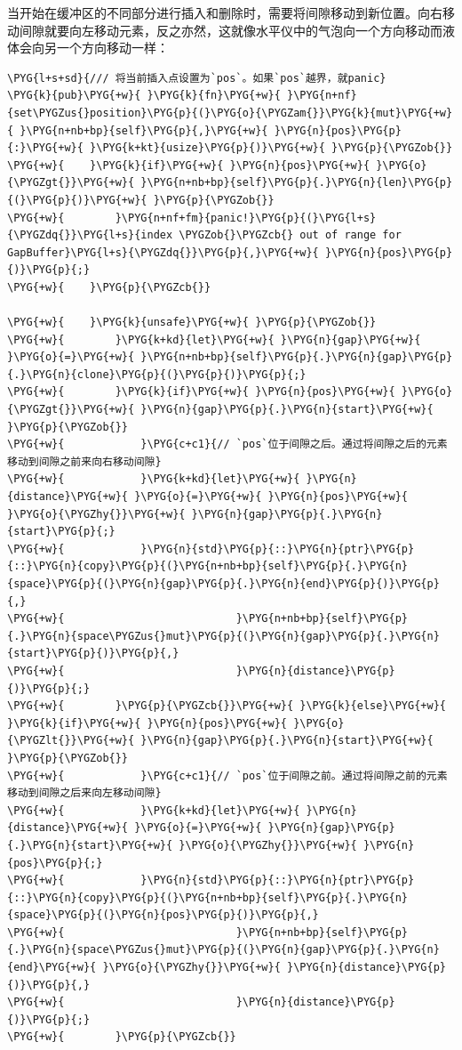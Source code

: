 当开始在缓冲区的不同部分进行插入和删除时，需要将间隙移动到新位置。向右移动间隙就要向左移动元素，反之亦然，这就像水平仪中的气泡向一个方向移动而液体会向另一个方向移动一样：

\begin{Verbatim}[commandchars=\\\{\},breaklines=true,breakanywhere=true,fontsize=\codefont,xleftmargin=17bp]
\PYG{l+s+sd}{/// 将当前插入点设置为`pos`。如果`pos`越界，就panic}
\PYG{k}{pub}\PYG{+w}{ }\PYG{k}{fn}\PYG{+w}{ }\PYG{n+nf}{set\PYGZus{}position}\PYG{p}{(}\PYG{o}{\PYGZam{}}\PYG{k}{mut}\PYG{+w}{ }\PYG{n+nb+bp}{self}\PYG{p}{,}\PYG{+w}{ }\PYG{n}{pos}\PYG{p}{:}\PYG{+w}{ }\PYG{k+kt}{usize}\PYG{p}{)}\PYG{+w}{ }\PYG{p}{\PYGZob{}}
\PYG{+w}{    }\PYG{k}{if}\PYG{+w}{ }\PYG{n}{pos}\PYG{+w}{ }\PYG{o}{\PYGZgt{}}\PYG{+w}{ }\PYG{n+nb+bp}{self}\PYG{p}{.}\PYG{n}{len}\PYG{p}{(}\PYG{p}{)}\PYG{+w}{ }\PYG{p}{\PYGZob{}}
\PYG{+w}{        }\PYG{n+nf+fm}{panic!}\PYG{p}{(}\PYG{l+s}{\PYGZdq{}}\PYG{l+s}{index \PYGZob{}\PYGZcb{} out of range for GapBuffer}\PYG{l+s}{\PYGZdq{}}\PYG{p}{,}\PYG{+w}{ }\PYG{n}{pos}\PYG{p}{)}\PYG{p}{;}
\PYG{+w}{    }\PYG{p}{\PYGZcb{}}

\PYG{+w}{    }\PYG{k}{unsafe}\PYG{+w}{ }\PYG{p}{\PYGZob{}}
\PYG{+w}{        }\PYG{k+kd}{let}\PYG{+w}{ }\PYG{n}{gap}\PYG{+w}{ }\PYG{o}{=}\PYG{+w}{ }\PYG{n+nb+bp}{self}\PYG{p}{.}\PYG{n}{gap}\PYG{p}{.}\PYG{n}{clone}\PYG{p}{(}\PYG{p}{)}\PYG{p}{;}
\PYG{+w}{        }\PYG{k}{if}\PYG{+w}{ }\PYG{n}{pos}\PYG{+w}{ }\PYG{o}{\PYGZgt{}}\PYG{+w}{ }\PYG{n}{gap}\PYG{p}{.}\PYG{n}{start}\PYG{+w}{ }\PYG{p}{\PYGZob{}}
\PYG{+w}{            }\PYG{c+c1}{// `pos`位于间隙之后。通过将间隙之后的元素移动到间隙之前来向右移动间隙}
\PYG{+w}{            }\PYG{k+kd}{let}\PYG{+w}{ }\PYG{n}{distance}\PYG{+w}{ }\PYG{o}{=}\PYG{+w}{ }\PYG{n}{pos}\PYG{+w}{ }\PYG{o}{\PYGZhy{}}\PYG{+w}{ }\PYG{n}{gap}\PYG{p}{.}\PYG{n}{start}\PYG{p}{;}
\PYG{+w}{            }\PYG{n}{std}\PYG{p}{::}\PYG{n}{ptr}\PYG{p}{::}\PYG{n}{copy}\PYG{p}{(}\PYG{n+nb+bp}{self}\PYG{p}{.}\PYG{n}{space}\PYG{p}{(}\PYG{n}{gap}\PYG{p}{.}\PYG{n}{end}\PYG{p}{)}\PYG{p}{,}
\PYG{+w}{                           }\PYG{n+nb+bp}{self}\PYG{p}{.}\PYG{n}{space\PYGZus{}mut}\PYG{p}{(}\PYG{n}{gap}\PYG{p}{.}\PYG{n}{start}\PYG{p}{)}\PYG{p}{,}
\PYG{+w}{                           }\PYG{n}{distance}\PYG{p}{)}\PYG{p}{;}
\PYG{+w}{        }\PYG{p}{\PYGZcb{}}\PYG{+w}{ }\PYG{k}{else}\PYG{+w}{ }\PYG{k}{if}\PYG{+w}{ }\PYG{n}{pos}\PYG{+w}{ }\PYG{o}{\PYGZlt{}}\PYG{+w}{ }\PYG{n}{gap}\PYG{p}{.}\PYG{n}{start}\PYG{+w}{ }\PYG{p}{\PYGZob{}}
\PYG{+w}{            }\PYG{c+c1}{// `pos`位于间隙之前。通过将间隙之前的元素移动到间隙之后来向左移动间隙}
\PYG{+w}{            }\PYG{k+kd}{let}\PYG{+w}{ }\PYG{n}{distance}\PYG{+w}{ }\PYG{o}{=}\PYG{+w}{ }\PYG{n}{gap}\PYG{p}{.}\PYG{n}{start}\PYG{+w}{ }\PYG{o}{\PYGZhy{}}\PYG{+w}{ }\PYG{n}{pos}\PYG{p}{;}
\PYG{+w}{            }\PYG{n}{std}\PYG{p}{::}\PYG{n}{ptr}\PYG{p}{::}\PYG{n}{copy}\PYG{p}{(}\PYG{n+nb+bp}{self}\PYG{p}{.}\PYG{n}{space}\PYG{p}{(}\PYG{n}{pos}\PYG{p}{)}\PYG{p}{,}
\PYG{+w}{                           }\PYG{n+nb+bp}{self}\PYG{p}{.}\PYG{n}{space\PYGZus{}mut}\PYG{p}{(}\PYG{n}{gap}\PYG{p}{.}\PYG{n}{end}\PYG{+w}{ }\PYG{o}{\PYGZhy{}}\PYG{+w}{ }\PYG{n}{distance}\PYG{p}{)}\PYG{p}{,}
\PYG{+w}{                           }\PYG{n}{distance}\PYG{p}{)}\PYG{p}{;}
\PYG{+w}{        }\PYG{p}{\PYGZcb{}}


\end{Verbatim}
